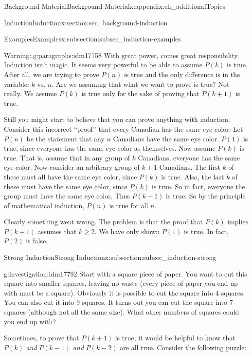 \documentclass[oneside,10pt,]{book}
\numberwithin{equation}{chapter}
\begin{document}
\begin{appendixptx}{Background Material}{}{Background Material}{}{}{x:appendix:ch_additionalTopics}
\begin{sectionptx}{Induction}{}{Induction}{}{}{x:section:sec_background-induction}
\begin{subsectionptx}{Examples}{}{Examples}{}{}{x:subsection:subsec_induction-examples}
\begin{paragraphs}{Warning:.}{g:paragraphs:idm17758}
With great power, comes great responsibility. Induction isn't magic. It seems very powerful to be able to assume \(P(k)\) is true. After all, we are trying to prove \(P(n)\) is true and the only difference is in the variable: \(k\) vs. \(n\). Are we assuming that what we want to prove is true? Not really. We assume \(P(k)\) is true only for the sake of proving that \(P(k+1)\) is true.%
\par
Still you might start to believe that you can prove anything with induction. Consider this incorrect ``proof'' that every Canadian has the same eye color: Let \(P(n)\) be the statement that any \(n\) Canadians have the same eye color. \(P(1)\) is true, since everyone has the same eye color as themselves. Now assume \(P(k)\) is true. That is, assume that in any group of \(k\) Canadians, everyone has the same eye color. Now consider an arbitrary group of \(k+1\) Canadians. The first \(k\) of these must all have the same eye color, since \(P(k)\) is true. Also, the last \(k\) of these must have the same eye color, since \(P(k)\) is true. So in fact, everyone the group must have the same eye color. Thus \(P(k+1)\) is true. So by the principle of mathematical induction, \(P(n)\) is true for all \(n\).%
\par
Clearly something went wrong. The problem is that the proof that \(P(k)\) implies \(P(k+1)\) assumes that \(k \ge 2\). We have only shown \(P(1)\) is true. In fact, \(P(2)\) is false.%
\end{paragraphs}%
\end{subsectionptx}
%
%
\typeout{************************************************}
\typeout{************************************************}
%
\begin{subsectionptx}{Strong Induction}{}{Strong Induction}{}{}{x:subsection:subsec_induction-strong}
\begin{investigation}{}{g:investigation:idm17792}%
Start with a square piece of paper. You want to cut this square into smaller squares, leaving no waste (every piece of paper you end up with must be a square). Obviously it is possible to cut the square into 4 squares. You can also cut it into 9 squares. It turns out you can cut the square into 7 squares (although not all the same size). What other numbers of squares could you end up with?%
\end{investigation}
Sometimes, to prove that \(P(k+1)\) is true, it would be helpful to know that \(P(k)\) \emph{and} \(P(k-1)\) \emph{and} \(P(k-2)\) are all true. Consider the following puzzle:%

\end{subsectionptx}
\end{sectionptx}
\end{appendixptx}
\end{document}
